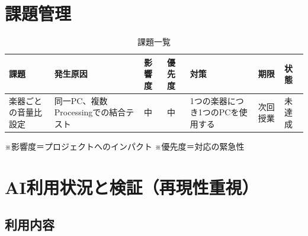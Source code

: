 \documentclass[uplatex,dvipdfmx]{jlreq}
\begin{document}
\section{課題管理}

\begin{table}[H]
    \centering
    \caption{課題一覧}
    \label{tab:issues}
    \begin{tabular}{lllllll}
        \toprule
        課題 & 発生原因 & 影響度 & 優先度 & 対策 & 期限 & 状態 \\
        \midrule
        楽器ごとの音量比設定 & 同一PC、複数Processingでの結合テスト & 中 & 中 & 1つの楽器につき1つのPCを使用する & 次回授業 & 未達成 \\
        \bottomrule
    \end{tabular}
\end{table}

\noindent
{\small ※影響度＝プロジェクトへのインパクト \quad ※優先度＝対応の緊急性}

\section{AI利用状況と検証（再現性重視）}

\subsection{利用内容}
\end{document}
